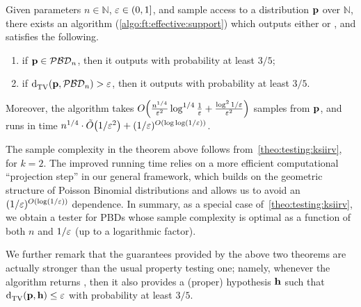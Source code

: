 \begin{theorem}\label{theo:testing:[bd}
    Given parameters $n\in\mathbb{N}$, $\varepsilon\in(0,1]$, and sample access to a distribution $\mathbf{p}$ over $\mathbb{N}$, there exists an algorithm (\cref{algo:ft:effective:support}) which outputs either \accept or \reject, and satisfies the following.
    \begin{enumerate}
        \item if $\mathbf{p} \in \mathcal{PBD}_{n}$, then it outputs \accept with probability at least $3/5$;
        \item if ${\operatorname{d}_{\textrm{TV}}^{}\!\left({\mathbf{p}, \mathcal{PBD}_{n}}\right)} > \varepsilon$, then it outputs \reject with probability at least $3/5$.
    \end{enumerate}
    Moreover, the algorithm takes $\bigO{\frac{n^{1/4}}{\eps^2}\log^{1/4}\frac{1}{\eps} + \frac{\log^2 1/\eps}{\eps^2}}$ samples from $\mathbf{p}$, and runs in time $n^{1/4}\cdot\tildeO{{1}/{\eps^2}}+(1/\eps)^{\bigO{\log\log(1/\eps)}}$.
\end{theorem}

The sample complexity in the theorem above follows from~\cref{theo:testing:ksiirv}, for $k=2$. 
The improved running time relies on a more efficient computational ``projection step''  in our general framework,
which builds on the geometric structure of Poisson Binomial distributions and allows us to avoid an $(1/\eps)^{\bigO{\log(1/\eps)}}$ dependence. 
In summary, as a special case of~\cref{theo:testing:ksiirv}, we obtain a tester for PBDs 
whose sample complexity is optimal as a function of both $n$ and $1/\varepsilon$ (up to a logarithmic factor).

We further remark that the guarantees provided by the above two theorems 
are actually stronger than the usual property testing one; namely, whenever the algorithm returns \accept, 
then it also provides a (proper) hypothesis $\mathbf{h}$ such that ${\operatorname{d}_{\textrm{TV}}^{}\!\left({\mathbf{p}, \mathbf{h}}\right)}\leq \varepsilon$ with probability at least $3/5$.


